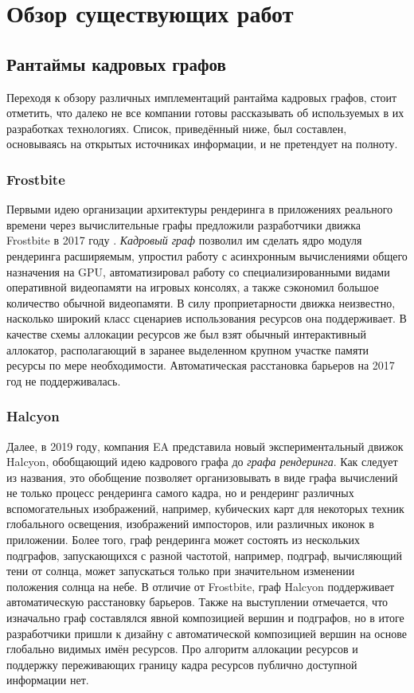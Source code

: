 \section{Обзор существующих работ}
\subsection{Рантаймы кадровых графов}
Переходя к обзору различных имплементаций рантайма кадровых графов, стоит отметить, что далеко не все компании готовы рассказывать об используемых в их разработках технологиях. Список, приведённый ниже, был составлен, основываясь на открытых источниках информации, и не претендует на полноту.
\subsubsection*{Frostbite}
Первыми идею организации архитектуры рендеринга в приложениях реального времени через вычислительные графы предложили разработчики движка Frostbite в 2017 году \cite{FrostbiteGdcTalk}.
\textit{Кадровый граф} позволил им сделать ядро модуля рендеринга расширяемым, упростил работу с асинхронным вычислениями общего назначения на GPU, автоматизировал работу со специализированными видами оперативной видеопамяти на игровых консолях, а также сэкономил большое количество обычной видеопамяти.
В силу проприетарности движка неизвестно, насколько широкий класс сценариев использования ресурсов она поддерживает.
В качестве схемы аллокации ресурсов же был взят обычный интерактивный аллокатор, располагающий в заранее выделенном крупном участке памяти ресурсы по мере необходимости.
Автоматическая расстановка барьеров на 2017 год не поддерживалась.

\subsubsection*{Halcyon}
Далее, в 2019 году, компания EA представила \cite{HalcyonRapidInnovationTalk} новый экспериментальный движок Halcyon, обобщающий идею кадрового графа до \textit{графа рендеринга}.
Как следует из названия, это обобщение позволяет организовывать в виде графа вычислений не только процесс рендеринга самого кадра, но и рендеринг различных вспомогательных изображений, например, кубических карт для некоторых техник глобального освещения, изображений импосторов, или различных иконок в приложении.
Более того, граф рендеринга может состоять из нескольких подграфов, запускающихся с разной частотой, например, подграф, вычисляющий тени от солнца, может запускаться только при значительном изменении положения солнца на небе.
В отличие от Frostbite, граф Halcyon поддерживает автоматическую расстановку барьеров.
Также на выступлении отмечается, что изначально граф составлялся явной композицией вершин и подграфов, но в итоге разработчики пришли к дизайну с автоматической композицией вершин на основе глобально видимых имён ресурсов.
Про алгоритм аллокации ресурсов и поддержку переживающих границу кадра ресурсов публично доступной информации нет.

